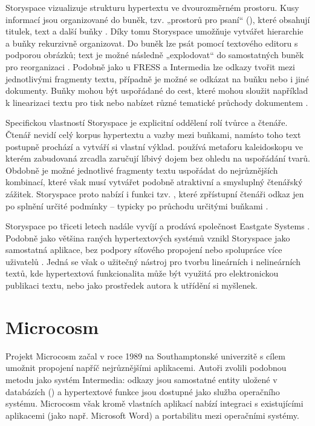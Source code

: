 \label{p:storyspace:cell}
Storyspace vizualizuje strukturu hypertextu ve dvourozměrném prostoru. Kusy informací jsou organizované do buněk, tzv. „prostorů pro psaní“ (), které obsahují titulek, text a další buňky \autocites[382]{Joyce1991}[29]{Muller-Prove2002}. Díky tomu Storyspace umožňuje vytvářet hierarchie a buňky rekurzivně organizovat. Do buněk lze psát pomocí textového editoru s podporou obrázků; text je možné následně „explodovat“ do samostatných buněk pro reorganizaci \autocite[383]{Joyce1991}. Podobně jako u FRESS a Intermedia lze odkazy tvořit mezi jednotlivými fragmenty textu, případně je možné se odkázat na buňku nebo i jiné dokumenty. Buňky mohou být uspořádané do cest, které mohou sloužit například k linearizaci textu pro tisk nebo nabízet různé tematické průchody dokumentem \autocite[385]{Joyce1991}.

Specifickou vlastností Storyspace je explicitní oddělení rolí tvůrce a čtenáře. Čtenář nevidí celý korpus hypertextu a vazby mezi buňkami, namísto toho text postupně prochází a vytváří si vlastní výklad. \Textcite[219--220]{Ryan2001} používá metaforu kaleidoskopu ve kterém zabudovaná zrcadla zaručují líbivý dojem bez ohledu na uspořádání tvarů. Obdobně je možné jednotlivé fragmenty textu uspořádat do nejrůznějších kombinací, které však musí vytvářet podobně atraktivní a smysluplný čtenářský zážitek. Storyspace proto nabízí i funkci tzv. , které zpřístupní čtenáři odkaz jen po splnění určité podmínky -- typicky po průchodu určitými buňkami \autocites[386]{Joyce1991}[125]{Barnet2014}. 

Storyspace po třiceti letech nadále vyvíjí a prodává společnost Eastgate Systems \autocite{Eastgate:Storyspace}. Podobně jako většina raných hypertextových systémů vznikl Storyspace jako samostatná aplikace, bez podpory síťového propojení nebo spolupráce více uživatelů \autocite[131,134]{Barnet2014}. Jedná se však o užitečný nástroj pro tvorbu lineárních i nelineárních textů, kde hypertextová funkcionalita může být využitá pro elektronickou publikaci textu, nebo jako prostředek autora k utřídění si myšlenek.

\section{Microcosm}
\label{sec:microcosm}

Projekt Microcosm začal v roce 1989 na Southamptonské univerzitě s cílem umožnit propojení napříč nejrůznějšími aplikacemi. Autoři zvolili podobnou metodu jako systém Intermedia: odkazy jsou samostatné entity uložené v databázích () \autocite[31]{Muller-Prove2002} a hypertextové funkce jsou dostupné jako služba operačního systému.
Microcosm však kromě vlastních aplikací nabízí integraci s existujícími aplikacemi (jako např. Microsoft Word) a portabilitu mezi operačními systémy.

